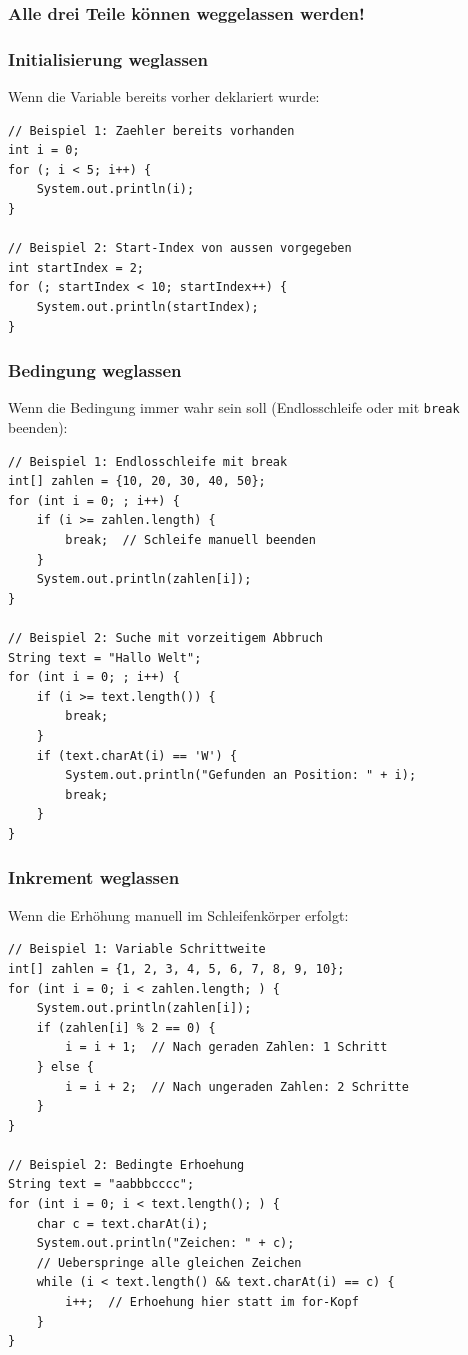\subsubsection*{Alle drei Teile können weggelassen werden!}

\subsubsection*{Initialisierung weglassen}

Wenn die Variable bereits vorher deklariert wurde:

\begin{lstlisting}
// Beispiel 1: Zaehler bereits vorhanden
int i = 0;
for (; i < 5; i++) {
    System.out.println(i);
}

// Beispiel 2: Start-Index von aussen vorgegeben
int startIndex = 2;
for (; startIndex < 10; startIndex++) {
    System.out.println(startIndex);
}
\end{lstlisting}

\subsubsection*{Bedingung weglassen}

Wenn die Bedingung immer wahr sein soll (Endlosschleife oder mit \texttt{break} beenden):

\begin{lstlisting}
// Beispiel 1: Endlosschleife mit break
int[] zahlen = {10, 20, 30, 40, 50};
for (int i = 0; ; i++) {
    if (i >= zahlen.length) {
        break;  // Schleife manuell beenden
    }
    System.out.println(zahlen[i]);
}

// Beispiel 2: Suche mit vorzeitigem Abbruch
String text = "Hallo Welt";
for (int i = 0; ; i++) {
    if (i >= text.length()) {
        break;
    }
    if (text.charAt(i) == 'W') {
        System.out.println("Gefunden an Position: " + i);
        break;
    }
}
\end{lstlisting}

\subsubsection*{Inkrement weglassen}

Wenn die Erhöhung manuell im Schleifenkörper erfolgt:

\begin{lstlisting}
// Beispiel 1: Variable Schrittweite
int[] zahlen = {1, 2, 3, 4, 5, 6, 7, 8, 9, 10};
for (int i = 0; i < zahlen.length; ) {
    System.out.println(zahlen[i]);
    if (zahlen[i] % 2 == 0) {
        i = i + 1;  // Nach geraden Zahlen: 1 Schritt
    } else {
        i = i + 2;  // Nach ungeraden Zahlen: 2 Schritte
    }
}

// Beispiel 2: Bedingte Erhoehung
String text = "aabbbcccc";
for (int i = 0; i < text.length(); ) {
    char c = text.charAt(i);
    System.out.println("Zeichen: " + c);
    // Ueberspringe alle gleichen Zeichen
    while (i < text.length() && text.charAt(i) == c) {
        i++;  // Erhoehung hier statt im for-Kopf
    }
}
\end{lstlisting}

